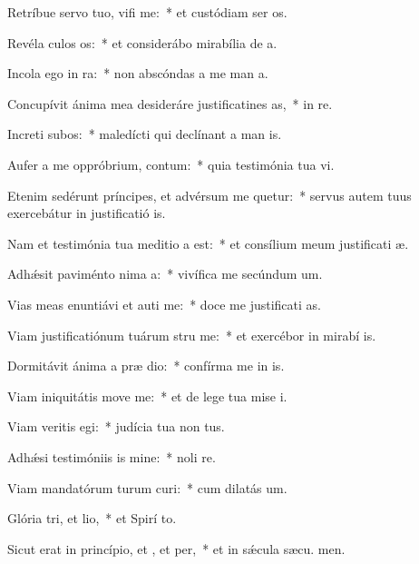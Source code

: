 \item Retríbue servo tuo, vifi me:~* et custódiam ser os.
\item Revéla culos os:~* et considerábo mirabília de  a.
\item Incola ego  in ra:~* non abscóndas a me man a.
\item Concupívit ánima mea desideráre justificatines as,~* in  re.
\item Increti subos:~* maledícti qui declínant a man is.
\item Aufer a me oppróbrium,  contum:~* quia testimónia tua vi.
\item Etenim sedérunt príncipes, et advérsum me quetur:~* servus autem tuus exercebátur in justificatió is.
\item Nam et testimónia tua meditio a est:~* et consílium meum justificati æ.
\item Adhǽsit paviménto nima a:~* vivífica me secúndum  um.
\item Vias meas enuntiávi et auti me:~* doce me justificati as.
\item Viam justificatiónum tuárum stru me:~* et exercébor in mirabí is.
\item Dormitávit ánima a præ dio:~* confírma me in  is.
\item Viam iniquitátis move  me:~* et de lege tua mise i.
\item Viam veritis egi:~* judícia tua non  tus.
\item Adhǽsi testimóniis is mine:~* noli  re.
\item Viam mandatórum turum curi:~* cum dilatás  um.
\item Glória tri, et lio,~* et Spirí to.
\item Sicut erat in princípio, et , et per,~* et in sǽcula sæcu. men.

